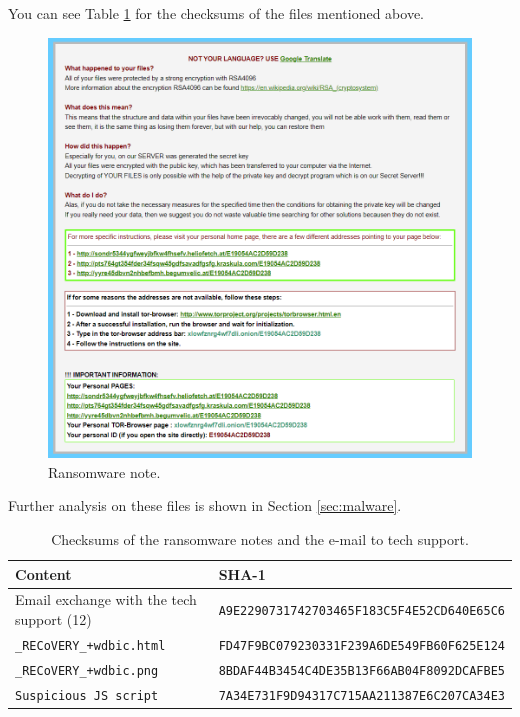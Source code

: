 \documentclass[12pt]{article}
\begin{document}
You can see Table \ref{table:sha1-malware-info} for the checksums of the files mentioned above.

\begin{figure}[!ht]
    \centering
    \includegraphics[width=\textwidth]{images/recovery_file.png}
    \caption{Ransomware note.}
    \label{fig:rec-file}
\end{figure}
Further analysis on these files is shown in Section \ref{sec:malware}.

\begin{table}[!ht]
    \centering
    \begin{tabular}{ll}
    \toprule
    \textbf{Content} & \textbf{SHA-1} \\
    \midrule
    Email exchange with the tech support (12) & \texttt{A9E2290731742703465F183C5F4E52CD640E65C6} \\
    \texttt{\_RECoVERY\_+wdbic.html} & \texttt{FD47F9BC079230331F239A6DE549FB60F625E124} \\
    \texttt{\_RECoVERY\_+wdbic.png} & \texttt{8BDAF44B3454C4DE35B13F66AB04F8092DCAFBE5} \\
    \texttt{Suspicious JS script} & \texttt{7A34E731F9D94317C715AA211387E6C207CA34E3} \\
    \bottomrule
    \end{tabular}
    \caption{Checksums of the ransomware notes and the e-mail to tech support.}
    \label{table:sha1-malware-info}
\end{table}
\end{document}
